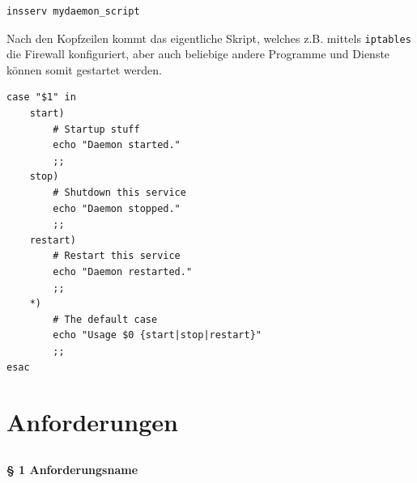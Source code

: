 \begin{verbatim}
insserv mydaemon_script
\end{verbatim}

Nach den Kopfzeilen kommt das eigentliche Skript, welches z.B. mittels
{\tt iptables} die Firewall konfiguriert, aber auch beliebige andere Programme
und Dienste können somit gestartet werden.

\begin{lstlisting}[label=lst:lsb-script,caption={Init Script LSB: Eigentliches Skript.}]
case "$1" in
    start)
        # Startup stuff
        echo "Daemon started."
        ;;
    stop)
        # Shutdown this service
        echo "Daemon stopped."
        ;;
    restart)
        # Restart this service
        echo "Daemon restarted."
        ;;
    *)
        # The default case
        echo "Usage $0 {start|stop|restart}"
        ;;
esac
\end{lstlisting}


\section{Anforderungen}

\subsection{\fwa}

\paragraph{§ 1 Anforderungsname}

\subsection{\fwb}

